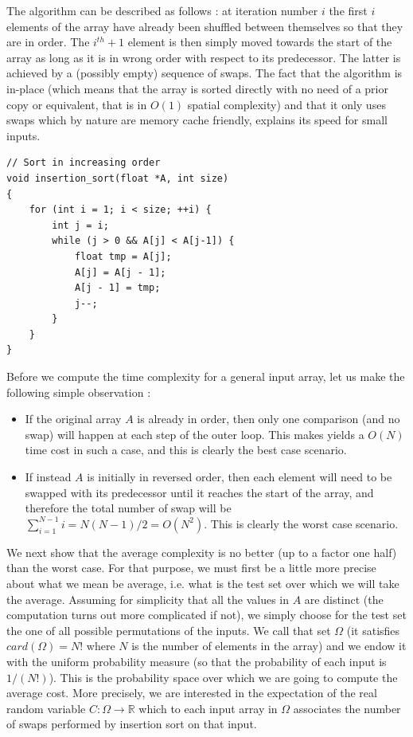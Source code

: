 \documentclass[12pt]{article}
\theoremstyle{plain}
\theoremstyle{remark}
\begin{document}
The algorithm can be described as follows : at iteration number $i$ the first
$i$ elements of the array have already been shuffled between themselves so 
that they are in order. The $i^{th} + 1$ element is then simply moved towards
the start of the array as long as it is in wrong order with respect to its
predecessor. The latter is achieved by a (possibly empty) sequence of swaps. 
The fact that the algorithm is in-place (which means that the array is sorted
directly with no need of a prior copy or equivalent, that is in $O(1)$ spatial 
complexity) and that it only uses swaps which by nature are memory cache
friendly, explains its speed for small inputs.

\begin{lstlisting}[style=C]
// Sort in increasing order 
void insertion_sort(float *A, int size)
{
	for (int i = 1; i < size; ++i) {
		int j = i;
		while (j > 0 && A[j] < A[j-1]) {
			float tmp = A[j];
			A[j] = A[j - 1];
			A[j - 1] = tmp;
			j--;
		}
	}
}
\end{lstlisting}

Before we compute the time complexity for a general input array, let us make the
following simple observation :
\begin{itemize}
	\item If the original array $A$ is already in order,
		then only one comparison (and no swap) will happen at each step
		of the outer loop. This makes yields a $O(N)$ time cost in such
		a case, and this is clearly the best case scenario.
	\item If instead $A$ is initially in reversed order, then each element
		will need to be swapped with its predecessor until it reaches the
		start of the array, and therefore the total number of swap will 
		be $\sum_{i = 1}^{N - 1} i = N(N-1)/2 = O(N^2)$. This is clearly
		the worst case scenario.
\end{itemize}

We next show that the average complexity is no better (up to a factor one half) than
the worst case. For that purpose, we must first be a little more precise about what
we mean be average, i.e. what is the test set over which we will take the
average. Assuming for simplicity that all the values in $A$ are distinct 
(the computation turns out more complicated if not), we simply choose 
for the test set the one of all possible permutations of the inputs. We call 
that set $\Omega$ (it satisfies $card(\Omega) = N!$ where $N$ is the number of
elements in the array) and we endow it with the uniform probability measure (so
that the probability of each input is $1/(N!)$). This is the probability space
over which we are going to compute the average cost. More precisely, we are
interested in the expectation of the real random variable $C : \Omega \to \mathbb{R}$ which 
to each input array in $\Omega$ associates the number of swaps performed by insertion sort 
on that input.
\end{document}

